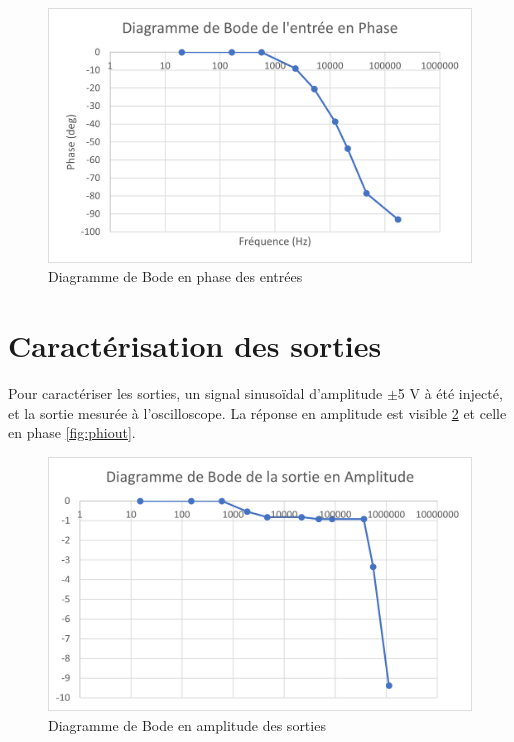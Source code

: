 \documentclass{report}
\begin{document}
\begin{figure}[h!]
\begin{center}
\includegraphics[scale=0.7]{IMAGES/phi_in.png} 
\end{center}
\caption{Diagramme de Bode en phase des entrées}
\label{fig:phiin}
\end{figure}


\section{Caractérisation des sorties}
Pour caractériser les sorties, un signal sinusoïdal d'amplitude $\pm$5 V à été injecté, et la sortie mesurée à l'oscilloscope.  La réponse en amplitude est visible  \ref{fig:ampout} et celle en phase  \ref{fig:phiout}.

\begin{figure}[h!]
\begin{center}
\includegraphics[scale=0.7]{IMAGES/amp_out.png} 
\end{center}
\caption{Diagramme de Bode en amplitude des sorties}
\label{fig:ampout}
\end{figure}
\end{document}
